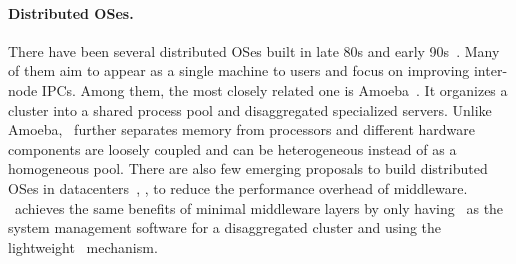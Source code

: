 \paragraph{Distributed OSes.}
There have been several distributed OSes built in late 80s and early 90s~\cite{Amoeba-Status,Amoeba-Experience,Sprite,MOSIX,V-System,Accent-SOSP,DEMOS-SOSP,Charlotte}.
Many of them aim to appear as a single machine to users and focus on improving inter-node IPCs. 
Among them, the most closely related one is Amoeba~\cite{Amoeba-Status,Amoeba-Experience}.
It organizes a cluster into a shared process pool and disaggregated specialized servers.
Unlike Amoeba, \lego\ further separates memory from processors and different hardware components are
loosely coupled and can be heterogeneous instead of as a homogeneous pool.
There are also few emerging proposals to build distributed OSes in datacenters~\cite{Wolfgang-hotcloud18,Schwarzkopf-apsys13}, 
\eg, to reduce the performance overhead of middleware.
\lego\ achieves the same benefits of minimal middleware layers by only 
having \lego\ as the system management software for a disaggregated cluster
and using the lightweight \vnode\ mechanism.

